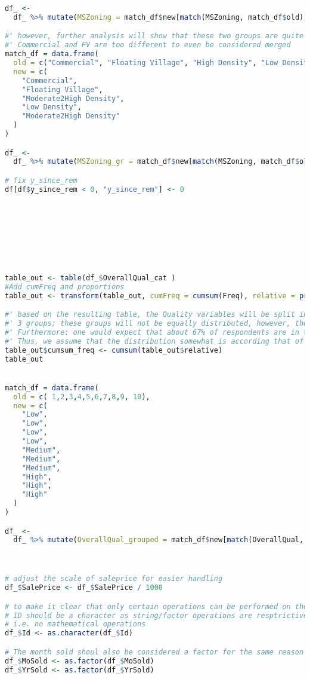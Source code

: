 \documentclass[a4paper]{article}
\begin{document}
\begin{lstlisting}[language=R]
df_ <-
  df_ %>% mutate(MSZoning = match_df$new[match(MSZoning, match_df$old)])

#' however, further analysis will show that these two groups are quite comparable; so for the purpose of this analysis they are merged as well
#' Commercial and FV are too different to even be considered merged
match_df = data.frame(
  old = c("Commercial", "Floating Village", "High Density", "Low Density", "Moderate Density"),
  new = c(
    "Commercial",
    "Floating Village",
    "Moderate2High Density",
    "Low Density",
    "Moderate2High Density"
  )
)

df_ <-
  df_ %>% mutate(MSZoning_gr = match_df$new[match(MSZoning, match_df$old)])

# fix y_since_rem
df[df$y_since_rem < 0, "y_since_rem"] <- 0








table_out <- table(df_$OverallQual_cat )
#Add cumFreq and proportions
table_out <- transform(table_out, cumFreq = cumsum(Freq), relative = prop.table(Freq))

#' based on the resulting table, the Quality variables will be split into 
#' 3 groups; these groups will not be equally distributed, however, the size of the underlyign groups tend to be somewhat simialr
#' Furthermore: one would expect that about 67% of respondents are in the one std region 
#' Thus, we assume that the distribution somewhat is according that of a normal distributi
table_out$cumsum_freq <- cumsum(table_out$relative)
table_out


match_df = data.frame(
  old = c( 1,2,3,4,5,6,7,8,9, 10),
  new = c(
    "Low",
    "Low",
    "Low",
    "Low",
    "Medium",
    "Medium",
    "Medium",
    "High",
    "High",
    "High"
  )
)

df_ <-
  df_ %>% mutate(OverallQual_grouped = match_df$new[match(OverallQual, match_df$old)])



# adjust the scale of saleprice for easier handling
df_$SalePrice <- df_$SalePrice / 1000

# to make it clear that only certain operations can be performed on the data
# ID should be a character as string/factor operations are resptrictive by design
# i.e. no mathematical operations
df_$Id <- as.character(df_$Id)

# The month sold shoul also be considered a factor for the same reason before
df_$MoSold <- as.factor(df_$MoSold)
df_$YrSold <- as.factor(df_$YrSold)


\end{lstlisting}
\end{document}
